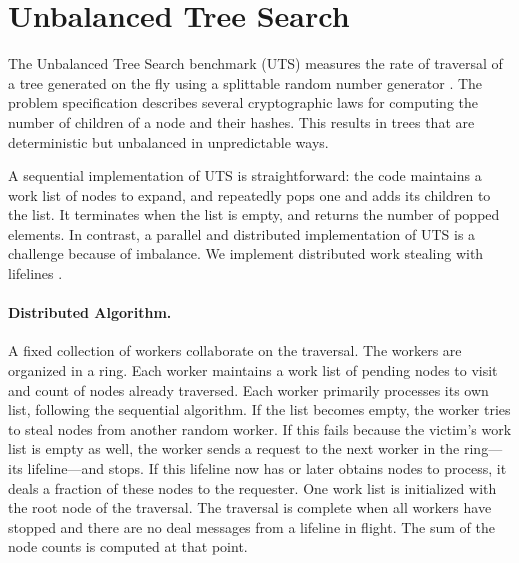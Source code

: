 \section{Unbalanced Tree Search}
\label{sec:uts}

The Unbalanced Tree Search benchmark (UTS) measures the rate of traversal of a
tree generated on the fly using a splittable random number generator
\cite{lcpc06}. The problem specification describes several cryptographic laws
for computing the number of children of a node and their hashes. This results
in trees that are deterministic but unbalanced in unpredictable ways. 

A sequential implementation of UTS is straightforward: the code maintains a
work list of nodes to expand, and repeatedly pops one and adds its children to
the list. It terminates when the list is empty, and returns the number of
popped elements. In contrast, a parallel and distributed implementation of UTS
is a challenge because of imbalance. We implement distributed work stealing
with lifelines \cite{ppopp11}.

\paragraph{Distributed Algorithm.} A fixed collection of workers collaborate on
the traversal. The workers are organized in a ring. Each worker maintains a
work list of pending nodes to visit and count of nodes already traversed. Each
worker primarily processes its own list, following the sequential algorithm. If
the list becomes empty, the worker tries to steal nodes from another random
worker. If this fails because the victim's work list is empty as well, the
worker sends a request to the next worker in the ring---its lifeline---and
stops. If this lifeline now has or later obtains nodes to process, it deals a
fraction of these nodes to the requester. One work list is initialized with the
root node of the traversal. The traversal is complete when all workers have
stopped and there are no deal messages from a lifeline in flight. The sum of
the node counts is computed at that point.

